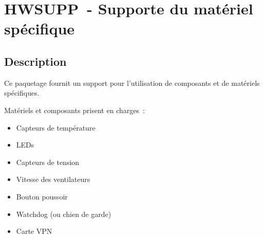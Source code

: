 \section {HWSUPP~- Supporte du matériel spécifique}

\subsection {Description}

Ce paquetage fournit un support pour l'utilisation de composants et de matériels
spécifiques.

Matériels et composants prisent en charges~:
\begin{itemize}
\item Capteurs de température
\item LEDs
\item Capteurs de tension
\item Vitesse des ventilateurs
\item Bouton poussoir
\item Watchdog (ou chien de garde)
\item Carte VPN
\end{itemize}

